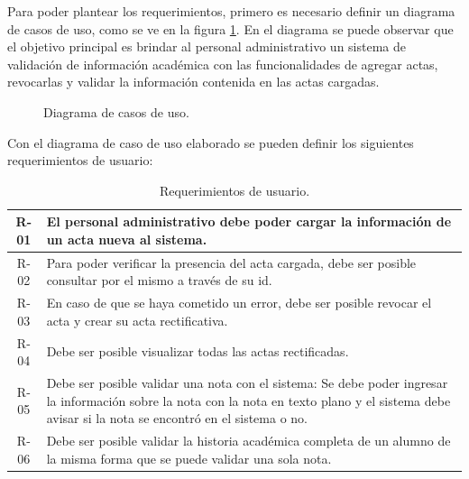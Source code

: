 Para poder plantear los requerimientos, primero es necesario definir un diagrama de casos de uso, como se ve en la figura \ref{fig:use_cases}. En el diagrama se puede observar que el objetivo principal es brindar al personal administrativo un sistema de validación de información académica con las funcionalidades de agregar actas, revocarlas y validar la información contenida en las actas cargadas.

\begin{figure}[H]
    \caption{Diagrama de casos de uso.}
    \label{fig:use_cases}
\end{figure}

Con el diagrama de caso de uso elaborado se pueden definir los siguientes requerimientos de usuario:
\begin{table}[h]
\begin{tabularx}{\textwidth}{|c|X|}
\hline
R-01 & El personal administrativo debe poder cargar la información de un acta nueva al sistema.\\
\hline
R-02 & Para poder verificar la presencia del acta cargada, debe ser posible consultar por el mismo a través de su id.\\
\hline
R-03 & En caso de que se haya cometido un error, debe ser posible revocar el acta y crear su acta rectificativa.\\
\hline
R-04 & Debe ser posible visualizar todas las actas rectificadas.\\
\hline
R-05 & Debe ser posible validar una nota con el sistema: Se debe poder ingresar la información sobre la nota con la nota en texto plano y el sistema debe avisar si la nota se encontró en el sistema o no.\\
\hline
R-06 & Debe ser posible validar la historia académica completa de un alumno de la misma forma que se puede validar una sola nota.\\
\hline
\end{tabularx}
\caption{Requerimientos de usuario.}
\label{table:req_user}
\end{table}

